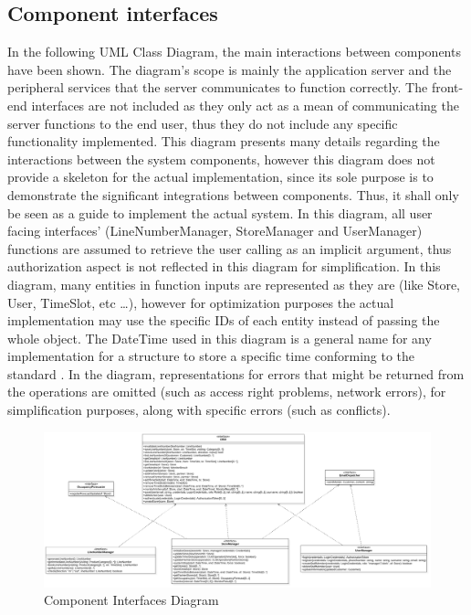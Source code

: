 \subsection{Component interfaces}
In the following UML Class Diagram, the main interactions between components have been shown.
The diagram's scope is mainly the application server and the peripheral services that the server communicates to function correctly.
The front-end interfaces are not included as they only act as a mean of communicating the server functions to the end user, thus they do not include any specific functionality implemented.
This diagram presents many details regarding the interactions between the system components, however this diagram does not provide a skeleton for the actual implementation, since its sole purpose is to demonstrate the significant integrations between components.
Thus, it shall only be seen as a guide to implement the actual system.
In this diagram, all user facing interfaces' (LineNumberManager, StoreManager and UserManager) functions are assumed to retrieve the user calling as an implicit argument, thus authorization aspect is not reflected in this diagram for simplification.
In this diagram, many entities in function inputs are represented as they are (like Store, User, TimeSlot, etc \ldots), however for optimization purposes the actual implementation may use the specific IDs of each entity instead of passing the whole object.
The DateTime used in this diagram is a general name for any implementation for a structure to store a specific time conforming to the standard \cite{}.
In the diagram, representations for errors that might be returned from the operations are omitted (such as access right problems, network errors), for simplification purposes, along with specific errors (such as conflicts).
\begin{figure}[H]
    \centering
    \includegraphics[height=0.4\textwidth]{Images/ComponentInterfacesDiagram.png}
    \caption{Component Interfaces Diagram}
    \label{fig:ComponentInterfaces}
\end{figure}
